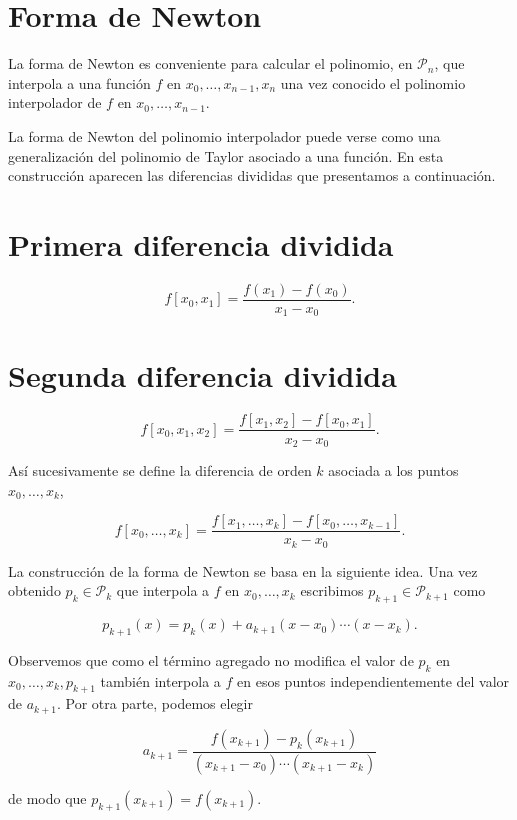\documentclass[10pt]{book}
\begin{document}
\section{Forma de Newton}
La forma de Newton es conveniente para calcular el polinomio, en $\mathcal{P}_{n}$, que interpola a una función $f$ en $x_{0}, \ldots, x_{n-1}, x_{n}$ una vez conocido el polinomio interpolador de $f$ en $x_{0}, \ldots, x_{n-1}$.

La forma de Newton del polinomio interpolador puede verse como una generalización del polinomio de Taylor asociado a una función. En esta construcción aparecen las diferencias divididas que presentamos a continuación.

\section*{Primera diferencia dividida}
$$
f\left[x_{0}, x_{1}\right]=\frac{f\left(x_{1}\right)-f\left(x_{0}\right)}{x_{1}-x_{0}} .
$$

\section*{Segunda diferencia dividida}
$$
f\left[x_{0}, x_{1}, x_{2}\right]=\frac{f\left[x_{1}, x_{2}\right]-f\left[x_{0}, x_{1}\right]}{x_{2}-x_{0}} .
$$

Así sucesivamente se define la diferencia de orden $k$ asociada a los puntos $x_{0}, \ldots, x_{k}$,

$$
f\left[x_{0}, \ldots, x_{k}\right]=\frac{f\left[x_{1}, \ldots, x_{k}\right]-f\left[x_{0}, \ldots, x_{k-1}\right]}{x_{k}-x_{0}} .
$$

La construcción de la forma de Newton se basa en la siguiente idea. Una vez obtenido $p_{k} \in \mathcal{P}_{k}$ que interpola a $f$ en $x_{0}, \ldots, x_{k}$ escribimos $p_{k+1} \in \mathcal{P}_{k+1}$ como

$$
p_{k+1}(x)=p_{k}(x)+a_{k+1}\left(x-x_{0}\right) \cdots\left(x-x_{k}\right) .
$$

Observemos que como el término agregado no modifica el valor de $p_{k}$ en $x_{0}, \ldots, x_{k}, p_{k+1}$ también interpola a $f$ en esos puntos independientemente del valor de $a_{k+1}$. Por otra parte, podemos elegir

$$
a_{k+1}=\frac{f\left(x_{k+1}\right)-p_{k}\left(x_{k+1}\right)}{\left(x_{k+1}-x_{0}\right) \cdots\left(x_{k+1}-x_{k}\right)}
$$

de modo que $p_{k+1}\left(x_{k+1}\right)=f\left(x_{k+1}\right)$.
\end{document}
